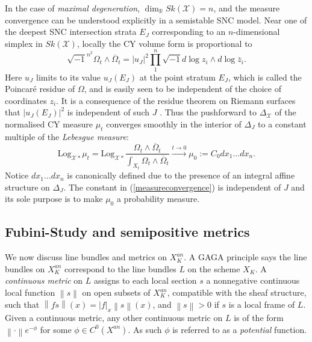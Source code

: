 \documentclass[a4paper]{article}
\theoremstyle{definition}
\newcommand{\R}{\mathbb{R}}
\newcommand{\norm}[1]{\left\lVert#1\right\rVert}
\begin{document}
	
In the case of \emph{maximal degeneration}, $\dim_\R Sk(\mathcal{X})=n$, and the measure convergence can be understood explicitly in a semistable SNC model. Near one of the deepest SNC intersection strata $E_J$ corresponding to an $n$-dimensional simplex in $Sk(\mathcal{X})$, locally the CY volume form is proportional to
	\begin{equation}\label{volumeasymptote}
		\sqrt{-1}^{n^2} \Omega_t\wedge \overline{\Omega}_t =  |u_J|^2  \prod_1^n \sqrt{-1} d\log z_i \wedge d\log \bar{z}_i.
	\end{equation}
	Here $u_J$ limits to its value $u_J(E_J)$ at the point stratum $E_J$, which is called the Poincar\'e residue of $\Omega$, and is easily seen to be independent of the choice of coordinates $z_i$. It is a consequence of the residue theorem on Riemann surfaces that $|u_J(E_J)|^2$ is independent of such $J$ \cite[Thm. 7.1]{Boucksom1}. Thus the pushforward to $\Delta_{\mathcal{X}}$ of the normalised CY measure $\mu_t$  converges smoothly in the interior of $\Delta_J$ to a constant multiple of the \emph{Lebesgue measure}:
	\begin{equation}\label{measureconvergence}
		\text{Log}_{ \mathcal{X} *  }\mu_t= \text{Log}_{ \mathcal{X}*  }\frac{ \Omega_t\wedge \overline{\Omega}_t }{  \int_{X_t}  \Omega_t\wedge \overline{\Omega}_t    } \xrightarrow{t\to 0}    \mu_0:=C_0  dx_1\ldots dx_n.
	\end{equation}
	Notice $dx_1\ldots dx_n$ is canonically defined due to the presence of an integral affine structure on $\Delta_J$. The constant in (\ref{measureconvergence}) is independent of $J$ and its sole purpose is to make $\mu_0$ a probability measure.
	
	
	
	

	
	
	
	
	
	
	
	
	
	
	\subsection{Fubini-Study and semipositive metrics}
	
	
	
	
	We now discuss line bundles and metrics on $X_K^{an}$.
	A GAGA principle says the line bundles on $X_K^{an}$ correspond to the line bundles $L$ on the scheme $X_K$. A \emph{continuous metric} on $L$ assigns to each local section $s$ a nonnegative continuous  local function $\norm{s}$ on open subsets of $X_K^{an}$, compatible with the sheaf structure, such that $\norm{fs}(x)= |f|_x\norm{s}(x)$, and $\norm{s}>0$ if $s$ is a local frame of $L$.
	Given a continuous metric, any other continuous metric on $L$ is of the form $\norm{\cdot} e^{-\phi}$ for some $\phi\in C^0(X^{an})$. As such $\phi$ is referred to as a \emph{potential} function.
	
\end{document}
